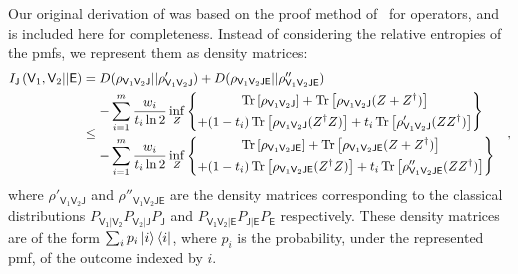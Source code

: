 \documentclass[10pt, a4paper]{article}
\numberwithin{equation}{section} %
\theoremstyle{definition}
\theoremstyle{plain}
\newcommand{\?}{\mathrel{?}} %
\newcommand{\Tr}[2][]{\mathop{\mathrm{Tr}#1}\left[ #2 \right]} %
\newcommand{\crv}[1]{\mathsf{#1}}
\begin{document}
\begin{appendices}
                    Our original derivation of  was based on the proof method of~\cite{BFF_QRE} for operators, and is included here for completeness. Instead of considering the relative entropies of the pmfs, we represent them as density matrices:
                    \begin{align}
                      \splitkey{\crv{V}_1,\crv{V}_2}{\crv{E}} &=  D(\rho_{\crv{V}_1\crv{V}_2\crv{J}}||\rho'_{\crv{V}_1\crv{V}_2\crv{J}})
                      + D(\rho_{\crv{V}_1\crv{V}_2\crv{JE}}||\rho''_{\crv{V}_1\crv{V}_2\crv{JE}}) \\
                                                              &\leq \begin{aligned}
                                                                - & \sum_{i=1}^m  \frac{w_i}{t_i\ln{2}}  \inf_{Z} \left\{ \begin{gathered}
                                                                  \Tr{\rho_{\crv{V}_1\crv{V}_2\crv{J}}}
                                                                + \Tr{\rho_{\crv{V}_1\crv{V}_2\crv{J}} (Z + Z^{\dagger})} \\
                                                              + (1-t_i) \Tr{\rho_{\crv{V}_1\crv{V}_2\crv{J}} (Z^{\dagger}Z)} 
                                                            + t_i \Tr{\rho'_{\crv{V}_1\crv{V}_2\crv{J}} (ZZ^{\dagger})}
                                                                \end{gathered} \right\} \\
                                                                    - & \sum_{i=1}^m \frac{w_i}{t_i\ln{2}} \inf_Z \left\{ \begin{gathered}
                                                                      \Tr{\rho_{\crv{V}_1\crv{V}_2\crv{JE}}}
                                                                    + \Tr{\rho_{\crv{V}_1\crv{V}_2\crv{JE}} (Z + Z^{\dagger})} \\
                                                                  + (1-t_i) \Tr{\rho_{\crv{V}_1\crv{V}_2\crv{JE}} (Z^{\dagger}Z)}
                                                                + t_i \Tr{\rho''_{\crv{V}_1\crv{V}_2\crv{JE}} (ZZ^{\dagger})}
                                                                    \end{gathered} \right\}
                                                                      \end{aligned},
                    \end{align}
                    where \(\rho'_{\crv{V}_1\crv{V}_2\crv{J}}\) and \(\rho''_{\crv{V}_1\crv{V}_2\crv{JE}}\) are the density matrices corresponding to the classical distributions \(P_{\crv{V_1|V_2}} P_{\crv{V}_2|\crv{J}} P_{\crv{J}}\) and \(P_{\crv{V_1V_2|E}} P_{\crv{J|E}} P_{\crv{E}}\) respectively. These density matrices are of the form \(\sum_i p_i \ket{i}\bra{i}\), where \(p_i\) is the probability, under the represented pmf, of the outcome indexed by \(i\).


\end{appendices}
\end{document}

